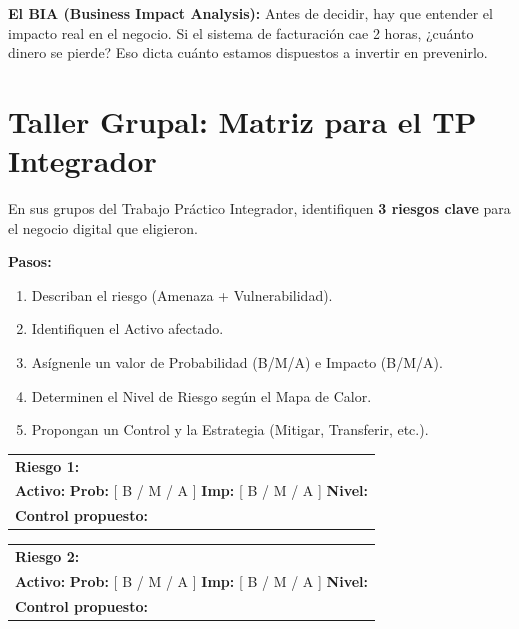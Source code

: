 \documentclass[12pt,a4paper]{article}
\renewcommand{\arraystretch}{1.25}
\begin{document}
\begin{cajaNota}
\textbf{El BIA (Business Impact Analysis):} Antes de decidir, hay que entender el impacto real en el negocio. Si el sistema de facturaci\'on cae 2 horas, ¿cu\'anto dinero se pierde? Eso dicta cu\'anto estamos dispuestos a invertir en prevenirlo.
\end{cajaNota}

\newpage
\section{Taller Grupal: Matriz para el TP Integrador}

\begin{cajaActividad}[title={Construcci\'on de la Matriz de Riesgos}]
En sus grupos del Trabajo Pr\'actico Integrador, identifiquen \textbf{3 riesgos clave} para el negocio digital que eligieron. 

\textbf{Pasos:}
\begin{enumerate}
    \item Describan el riesgo (Amenaza + Vulnerabilidad).
    \item Identifiquen el Activo afectado.
    \item As\'ignenle un valor de Probabilidad (B/M/A) e Impacto (B/M/A).
    \item Determinen el Nivel de Riesgo seg\'un el Mapa de Calor.
    \item Propongan un Control y la Estrategia (Mitigar, Transferir, etc.).
\end{enumerate}
\end{cajaActividad}

\vspace{8pt}
\renewcommand{\arraystretch}{1.8}
\begin{tabularx}{\textwidth}{|X|}
\hline
\textbf{Riesgo 1:} \hrulefill \\
\textbf{Activo:} \hrulefill \quad \textbf{Prob:} [ B / M / A ] \quad \textbf{Imp:} [ B / M / A ] \quad \textbf{Nivel:} \hrulefill \\
\textbf{Control propuesto:} \hrulefill \\
\hline
\end{tabularx}

\vspace{8pt}
\begin{tabularx}{\textwidth}{|X|}
\hline
\textbf{Riesgo 2:} \hrulefill \\
\textbf{Activo:} \hrulefill \quad \textbf{Prob:} [ B / M / A ] \quad \textbf{Imp:} [ B / M / A ] \quad \textbf{Nivel:} \hrulefill \\
\textbf{Control propuesto:} \hrulefill \\
\hline
\end{tabularx}
\end{document}

